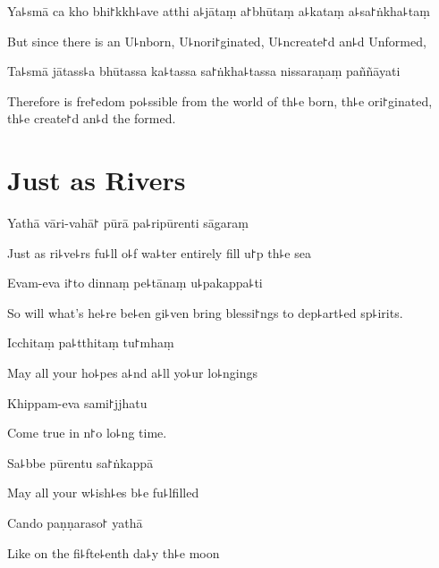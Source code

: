 Ya꜕smā ca kho bhi꜓kkh꜕ave atthi a꜕jātaṃ a꜓bhūtaṃ a꜕kataṃ a꜕sa꜓ṅkha꜕taṃ

\begin{english}
  But since there is an U꜕nborn, U꜕nori꜓ginated, U꜕ncreate꜓d an꜕d Unformed,
\end{english}

Ta꜕smā jātass꜕a bhūtassa ka꜕tassa sa꜓ṅkha꜕tassa nissaraṇaṃ paññāyati

\begin{english}
  Therefore is fre꜓edom po꜕ssible from the world of th꜕e born, th꜕e ori꜓ginated, th꜕e create꜓d an꜕d the formed.
\end{english}

\chapter{Just as Rivers}%


Yathā vāri-vahā꜓ pūrā pa꜕ripūrenti sāgaraṃ

\begin{english}
  Just as ri꜕ve꜕rs fu꜕ll o꜕f wa꜕ter entirely fill u꜓p th꜕e sea
\end{english}

Evam-eva i꜓to dinnaṃ pe꜕tānaṃ u꜕pakappa꜕ti

\begin{english}
  So will what's he꜕re be꜕en gi꜕ven bring blessi꜓ngs to dep꜕art꜕ed sp꜕irits.
\end{english}

Icchitaṃ pa꜕tthitaṃ tu꜓mhaṃ

\begin{english}
  May all your ho꜕pes a꜕nd a꜕ll yo꜕ur lo꜕ngings
\end{english}

Khippam-eva sami꜓jjhatu

\begin{english}
  Come true in n꜓o lo꜕ng time.
\end{english}

Sa꜕bbe pūrentu sa꜓ṅkappā

\begin{english}
  May all your w꜕ish꜕es b꜕e fu꜕lfilled
\end{english}

Cando paṇṇaraso꜓ yathā

\begin{english}
  Like on the fi꜕fte꜕enth da꜕y th꜕e moon
\end{english}

